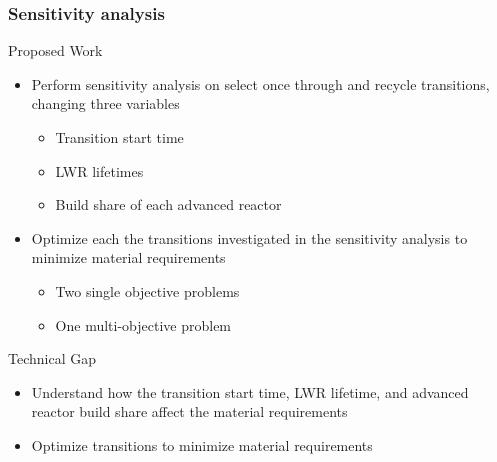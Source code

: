 \begin{frame}
        \frametitle{Sensitivity analysis}
        \begin{block}{Proposed Work}
                \begin{itemize}
                        \item Perform sensitivity analysis on select once through 
                        and recycle transitions, changing three variables
                        \begin{itemize}
                                \item Transition start time
                                \item \gls{LWR} lifetimes
                                \item Build share of each advanced reactor
                        \end{itemize}
                        \item Optimize each the transitions investigated in the 
                                sensitivity analysis to minimize material requirements
                        \begin{itemize}
                                \item Two single objective problems
                                \item One multi-objective problem
                        \end{itemize}
                \end{itemize}
        \end{block}
        \begin{block}{Technical Gap}
                \begin{itemize}
                        \item Understand how the transition start time, \gls{LWR} 
                                lifetime, and advanced reactor build share
                                affect the material requirements
                        \item Optimize transitions to minimize material requirements
                \end{itemize}
        \end{block}
\end{frame}


